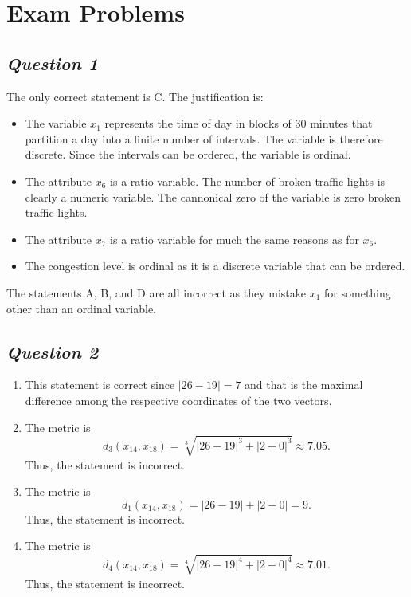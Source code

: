 \documentclass[twoside,11pt]{article}
\makeatletter
\let\@oldsection\section
\renewcommand\section[1]{\@oldsection*{#1}}
\let\@oldsubsection\subsection
\renewcommand\subsection[1]{\@oldsubsection*{\textit{#1}}}
\makeatother
\begin{document}
\section{Exam Problems}

\subsection{Question 1}

The only correct statement is C. The justification is:

\begin{itemize}
	\item The variable \(x_1\) represents the time of day in blocks of 30 minutes that partition a day into a finite number of intervals. The variable is therefore discrete. Since the intervals can be ordered, the variable is ordinal.

	\item The attribute \(x_6\) is a ratio variable. The number of broken traffic lights is clearly a numeric variable. The cannonical zero of the variable is zero broken traffic lights.

	\item The attribute \(x_7\) is a ratio variable for much the same reasons as for \(x_6\).

	\item The congestion level is ordinal as it is a discrete variable that can be ordered.
\end{itemize}

The statements A, B, and D are all incorrect as they mistake \(x_1\) for something other than an ordinal variable.

\subsection{Question 2}

\begin{enumerate}[label=\Alph*.]
	\item This statement is correct since \(|26 - 19| = 7\) and that is the maximal difference among the respective coordinates of the two vectors.

	\item The metric is
	\[
		d_3(x_{14}, x_{18}) = \sqrt[3]{|26 - 19|^3 + |2 - 0|^3} \approx 7.05.
	\]
	Thus, the statement is incorrect.

	\item The metric is
	\[
		d_1(x_{14}, x_{18}) = |26 - 19| + |2 - 0| = 9.
	\]
	Thus, the statement is incorrect.

	\item The metric is
	\[
		d_4(x_{14}, x_{18}) = \sqrt[4]{|26 - 19|^4 + |2 - 0|^4} \approx 7.01.
	\]
	Thus, the statement is incorrect.

\end{enumerate}
\end{document}
